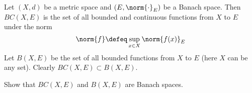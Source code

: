 \begin{defn}
	Let $(X,d)$ be a metric space and $(E,\norm{\cdot}_E)$ be a Banach space.
	Then $BC(X,E)$ is the set of all bounded and continuous functions from $X$ to $E$ under the norm 
	\[\norm{f} \defeq \sup_{x \in X} \norm{f(x)}_E\]
	Let $B(X,E)$ be the set of all bounded functions from $X$ to $E$ (here $X$ can be any set).
	Clearly $BC(X,E) \subset B(X,E)$.
\end{defn}

\begin{exer}
	Show that $BC(X,E)$ and $B(X,E)$ are Banach spaces.
\end{exer}

